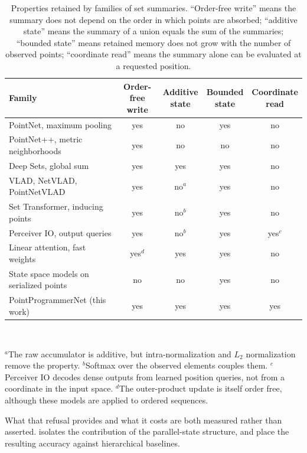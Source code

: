 \documentclass[11pt,a4paper]{article}
\begin{document}
\begin{table}[t]
\centering
\caption{Properties retained by families of set summaries. ``Order-free write'' means the summary does not depend on the order in which points are absorbed; ``additive state'' means the summary of a union equals the sum of the summaries; ``bounded state'' means retained memory does not grow with the number of observed points; ``coordinate read'' means the summary alone can be evaluated at a requested position.}
\label{tab:family-comparison}
\small
\begin{tabular}{lcccc}
\toprule
Family & \makecell{Order-free\\write} & \makecell{Additive\\state} & \makecell{Bounded\\state} & \makecell{Coordinate\\read} \\
\midrule
PointNet, maximum pooling & yes & no & yes & no \\
PointNet++, metric neighborhoods & yes & no & no & no \\
Deep Sets, global sum & yes & yes & yes & no \\
VLAD, NetVLAD, PointNetVLAD & yes & no$^{a}$ & yes & no \\
Set Transformer, inducing points & yes & no$^{b}$ & yes & no \\
Perceiver IO, output queries & yes & no$^{b}$ & yes & yes$^{c}$ \\
Linear attention, fast weights & yes$^{d}$ & yes & yes & no \\
State space models on serialized points & no & no & yes & no \\
\midrule
PointProgrammerNet (this work) & yes & yes & yes & yes \\
\bottomrule
\end{tabular}
\\[3pt]
\parbox{\linewidth}{\footnotesize $^{a}$The raw accumulator is additive, but intra-normalization and $L_2$ normalization remove the property. $^{b}$Softmax over the observed elements couples them. $^{c}$Perceiver IO decodes dense outputs from learned position queries, not from a coordinate in the input space. $^{d}$The outer-product update is itself order free, although these models are applied to ordered sequences.}
\end{table}

What that refusal provides and what it costs are both measured rather than asserted.  isolates the contribution of the parallel-state structure, and  place the resulting accuracy against hierarchical baselines.
\end{document}
